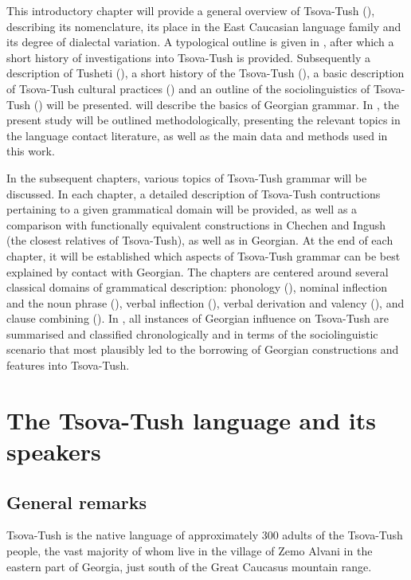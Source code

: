 This introductory chapter will provide a general overview of Tsova-Tush (), describing its nomenclature, its place in the East Caucasian language family and its degree of dialectal variation. A typological outline is given in , after which a short history of investigations into Tsova-Tush is provided. Subsequently a description of Tusheti (), a short history of the Tsova-Tush (), a basic description of Tsova\hyp Tush cultural practices () and an outline of the sociolinguistics of Tsova\hyp Tush () will be presented.  will describe the basics of Georgian grammar. In , the present study will be outlined methodologically, presenting the relevant topics in the language contact literature, as well as the main data and methods used in this work.

In the subsequent chapters, various topics of Tsova-Tush grammar will be discussed. In each chapter, a detailed description of Tsova-Tush contructions pertaining to a given grammatical domain will be provided, as well as a comparison with functionally equivalent constructions in Chechen and Ingush (the closest relatives of Tsova-Tush), as well as in Georgian. At the end of each chapter, it will be established which aspects of Tsova-Tush grammar can be best explained by contact with Georgian. The chapters are centered around several classical domains of grammatical description: phonology (), nominal inflection and the noun phrase (), verbal inflection (), verbal derivation and valency (), and clause combining (). In , all instances of Georgian influence on Tsova-Tush are summarised and classified chronologically and in terms of the sociolinguistic scenario that most plausibly led to the borrowing of Georgian constructions and features into Tsova-Tush.

\section{The Tsova-Tush language and its speakers}

\subsection{General remarks} \label{genremarks}
Tsova-Tush is the native language of approximately 300 adults of the Tsova-Tush people, the vast majority of whom live in the village of Zemo Alvani in the eastern part of Georgia, just south of the Great Caucasus mountain range.

